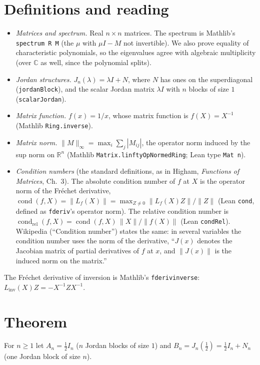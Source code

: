\documentclass[11pt]{article}
\renewcommand{\_}{\oldus\allowbreak}
\theoremstyle{remark}
\newcommand{\R}{\mathbb{R}}
\newcommand{\cond}{\operatorname{cond}}
\begin{document}
\section{Definitions and reading}
\begin{itemize}
\item \emph{Matrices and spectrum.} Real $n\times n$ matrices. The spectrum is Mathlib's
\texttt{spectrum R M} (the $\mu$ with $\mu I-M$ not invertible). We also prove equality of
characteristic polynomials, so the eigenvalues agree with algebraic multiplicity (over
$\mathbb C$ as well, since the polynomial splits).
\item \emph{Jordan structures.} $J_n(\lambda)=\lambda I+N$, where $N$ has ones on the
superdiagonal (\texttt{jordanBlock}), and the scalar Jordan matrix $\lambda I$ with $n$ blocks
of size $1$ (\texttt{scalarJordan}).
\item \emph{Matrix function.} $f(x)=1/x$, whose matrix function is $f(X)=X^{-1}$ (Mathlib
\texttt{Ring.inverse}).
\item \emph{Matrix norm.} $\|M\|_\infty=\max_i\sum_j|M_{ij}|$, the operator norm induced by the
sup norm on $\R^n$ (Mathlib \texttt{Matrix.linftyOpNormedRing}; Lean type \texttt{Mat n}).
\item \emph{Condition numbers} (the standard definitions, as in Higham, \emph{Functions of
Matrices}, Ch.~3). The absolute condition number of $f$ at $X$ is the operator norm of the
Fr\'echet derivative, $\cond(f,X)=\|L_f(X)\|=\max_{Z\neq0}\|L_f(X)Z\|/\|Z\|$ (Lean
\texttt{cond}, defined as \texttt{fderiv}'s operator norm). The relative condition number is
$\cond_{\mathrm{rel}}(f,X)=\cond(f,X)\,\|X\|/\|f(X)\|$ (Lean \texttt{condRel}). Wikipedia
(``Condition number'') states the same: in several variables the condition number uses the
norm of the derivative, ``$J(x)$ denotes the Jacobian matrix of partial derivatives of $f$ at
$x$, and $\|J(x)\|$ is the induced norm on the matrix.''
\end{itemize}
The Fr\'echet derivative of inversion is Mathlib's \texttt{fderiv\_inverse}:
$L_{\mathrm{inv}}(X)Z=-X^{-1}ZX^{-1}$.

\section{Theorem}
For $n\ge1$ let $A_n=\tfrac12 I_n$ ($n$ Jordan blocks of size $1$) and
$B_n=J_n(\tfrac12)=\tfrac12 I_n+N_n$ (one Jordan block of size $n$).
\end{document}
